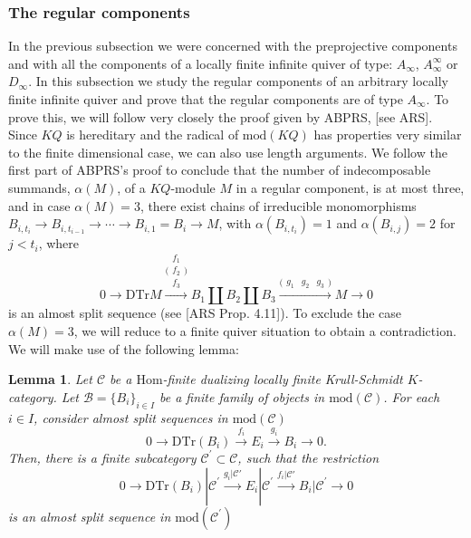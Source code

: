 \documentclass{amsart}
\theoremstyle{plain}
\newtheorem{lemma}{Lemma}
\numberwithin{equation}{section}
\begin{document}
\subsubsection{The regular components}

\bigskip In the previous subsection we were concerned with the preprojective
components and with all the components of a locally finite infinite quiver
of type: $A_{\infty }$, $A_{\infty }^{\infty }$ or $D_{\infty }$. In this
subsection we study the regular components of an arbitrary locally finite
infinite quiver and prove that the regular components are of type $A_{\infty
}$. To prove this, we will follow very closely the proof given by ABPRS,
[see ARS]. Since $KQ$ is hereditary and the radical of $\mathrm{mod}(KQ)$
has properties very similar to the finite dimensional case, we can also use
length arguments. We follow the first part of ABPRS's proof to conclude that
the number of indecomposable summands, $\alpha (M)$, of a $KQ$-module $M$ in
a regular component, is at most three, and in case $\alpha (M)=3$, there
exist chains of irreducible monomorphisms $B_{i,t_{i}}\rightarrow
B_{i,t_{i-1}}\rightarrow \cdots \rightarrow B_{i,1}=B_{i}\rightarrow M$,
with $\alpha (B_{i,t_{i}})=1$ and $\alpha (B_{i,j})=2$ for $j<t_{i}$, where
\begin{equation*}
0\rightarrow \mathrm{DTr}M\xrightarrow {\bigl(\begin{smallmatrix}
f_1\\f_2\\f_3\end{smallmatrix}\bigr)}B_{1}\coprod B_{2}\coprod B_{3}\xrightarrow{\bigl(\begin{smallmatrix} g_1&g_2&g_3\end{smallmatrix}\bigr)}M\rightarrow 0
\end{equation*}is an almost split sequence (see [ARS Prop. 4.11]). To exclude the case $\alpha (M)=3$, we will reduce to a finite quiver situation to obtain a
contradiction. We will make use of the following lemma:

\begin{lemma}
\label{herescsd4} Let $\mathcal{C}$ be a $\mathrm{Hom}$-finite dualizing
locally finite Krull-Schmidt $K$-category. Let $\mathcal{B}=\{B_{i}\}_{i\in
I}$ be a finite family of objects in $\mathrm{mod}(\mathcal{C})$. For each $i\in I$, consider almost split sequences in $\mathrm{mod}(\mathcal{C})$
\begin{equation*}
0\rightarrow \mathrm{DTr}(B_{i})\xrightarrow{f_i}E_{i}\xrightarrow{g_i}B_{i}\rightarrow 0\text{.}
\end{equation*}Then, there is a finite subcategory $\mathcal{C}^{\prime }\subset \mathcal{C}
$, such that the restriction
\begin{equation*}
0\rightarrow \mathrm{DTr}(B_{i})|\mathcal{C}^{\prime }\xrightarrow{g_i|\mathcal{C}'}E_{i}|\mathcal{C}^{\prime }\xrightarrow{f_i|\mathcal{C}'}B_{i}|\mathcal{C}^{\prime }\rightarrow 0
\end{equation*}is an almost split sequence in $\mathrm{mod}(\mathcal{C}^{\prime })$
\end{lemma}
\end{document}
